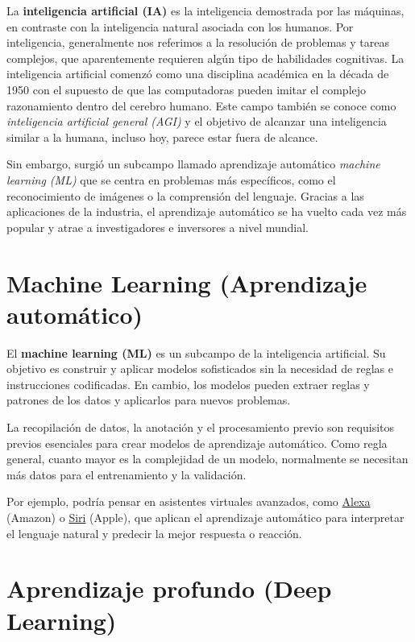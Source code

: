 \documentclass[
]{book}
\begin{document}
La \textbf{inteligencia artificial (IA)} es la inteligencia demostrada por las máquinas, en contraste con la inteligencia natural asociada con los humanos. Por inteligencia, generalmente nos referimos a la resolución de problemas y tareas complejos, que aparentemente requieren algún tipo de habilidades cognitivas. La inteligencia artificial comenzó como una disciplina académica en la década de 1950 con el supuesto de que las computadoras pueden imitar el complejo razonamiento dentro del cerebro humano. Este campo también se conoce como \emph{inteligencia artificial general (AGI)} y el objetivo de alcanzar una inteligencia similar a la humana, incluso hoy, parece estar fuera de alcance.

Sin embargo, surgió un subcampo llamado aprendizaje automático \emph{machine learning (ML)} que se centra en problemas más específicos, como el reconocimiento de imágenes o la comprensión del lenguaje. Gracias a las aplicaciones de la industria, el aprendizaje automático se ha vuelto cada vez más popular y atrae a investigadores e inversores a nivel mundial.

\hypertarget{machine-learning-aprendizaje-automuxe1tico}{%
\section{Machine Learning (Aprendizaje automático)}\label{machine-learning-aprendizaje-automuxe1tico}}

El \textbf{machine learning (ML)} es un subcampo de la inteligencia artificial. Su objetivo es construir y aplicar modelos sofisticados sin la necesidad de reglas e instrucciones codificadas. En cambio, los modelos pueden extraer reglas y patrones de los datos y aplicarlos para nuevos problemas.

La recopilación de datos, la anotación y el procesamiento previo son requisitos previos esenciales para crear modelos de aprendizaje automático. Como regla general, cuanto mayor es la complejidad de un modelo, normalmente se necesitan más datos para el entrenamiento y la validación.

Por ejemplo, podría pensar en asistentes virtuales avanzados, como \href{https://developer.amazon.com/alexa}{Alexa} (Amazon) o \href{https://www.apple.com/siri}{Siri} (Apple), que aplican el aprendizaje automático para interpretar el lenguaje natural y predecir la mejor respuesta o reacción.

\hypertarget{aprendizaje-profundo-deep-learning}{%
\section{Aprendizaje profundo (Deep Learning)}\label{aprendizaje-profundo-deep-learning}}
\end{document}
